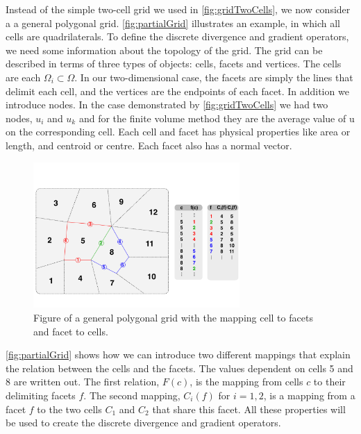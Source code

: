 Instead of the simple two-cell grid we used in \autoref{fig:gridTwoCells}, we now consider a a general polygonal grid. \autoref{fig:partialGrid} illustrates an example, in which all cells are quadrilaterals. To define the discrete divergence and gradient operators, we need some information about the topology of the grid. The grid can be described in terms of three types of objects: cells, facets and vertices. The cells are each $\Omega_i \subset \Omega$. In our two-dimensional case, the facets are simply the lines that delimit each cell, and the vertices are the endpoints of each facet. In addition we introduce nodes. In the case demonstrated by \autoref{fig:gridTwoCells} we had two nodes, $u_i$ and $u_k$ and for the finite volume method they are the average value of u on the corresponding cell. Each cell and facet has physical properties like area or length, and centroid or centre. Each facet also has a normal vector. 
\begin{figure}[H]
    \centering
    \includegraphics[width = 0.7\textwidth]{figures/grid_cells_facets.pdf}
    \caption{Figure of a general polygonal grid with the mapping cell to facets and facet to cells.}
    \label{fig:partialGrid}
\end{figure}

\autoref{fig:partialGrid} shows how we can introduce two different mappings that explain the relation between the cells and the facets. The values dependent on cells 5 and 8 are written out. The first relation, $F(c)$, is the mapping from cells $c$ to their delimiting facets $f$. The second mapping, $C_i(f)$ for $i = 1,2$, is a mapping from a facet $f$ to the two cells $C_1$ and $C_2$ that share this facet. All these properties will be used to create the discrete divergence and gradient operators.

